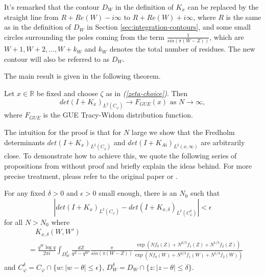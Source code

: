 \begin{remark}
\label{circle-deformation}
It's remarked that the contour $D_W$ in the definition of $K_x$ can be replaced by the straight line from $R + Re(W) - i\infty$ to $R + Re(W) + i \infty$, where $R$ is the same as in the definition of $D_W$ in Section \ref{sec:integration-contours}, and some small circles surrounding the poles coming from the term $\frac{1}{sin(\pi (W - Z))}$, which are $W+1, W+2, \dots, W+k_W$ and $k_W$ denotes the total number of residues. The new contour will also be referred to as $D_W$.
\end{remark}

The main result is given in the following theorem.
\begin{theorem}
\label{asymptotic-theorem}
Let $x \in \mathbb{R}$ be fixed and choose $\zeta$ as in \textit{(\ref{zeta-choice})}. Then $$det(I+K_x)_{L^2(C_{\varphi})} \rightarrow F_{GUE}(x) \text{ as } N \rightarrow \infty,$$ where $F_{GUE}$ is the GUE Tracy-Widom distribution function. 
\end{theorem}

The intuition for the proof is that for $N$ large we show that the Fredholm determinants $det(I+K_x)_{L^2(C_{\varphi})}$ and $det(I+K_{Ai})_{L^2(x,\infty)}$ are arbitrarily close. To demonstrate how to achieve this, we quote the following series of propositions from \cite{asymptotics2013} without proof and briefly explain the ideas behind. For more precise treatment, pleass refer to the original paper \cite{asymptotics2013} or \cite{phase2015}.

\begin{proposition} 
\label{restriction-contour}
For any fixed $\delta > 0$ and $\epsilon > 0$ small enough, there is an $N_0$ such that $$\left| det(I+K_x)_{L^2(C_{\varphi})} - det(I+K_{x,\delta})_{L^2(C_{\varphi}^{\delta})} \right| < \epsilon$$ for all $N > N_0$ where
\begin{align*}
& \quad K_{x,\delta}(W,W') \\
& = \frac{q^W \log q}{2 \pi i} \int_{D_W^{\delta}} \frac{dZ}{q^Z - q^{W'}} \frac{\pi}{sin(\pi (W-Z))} \frac{\exp(Nf_0(Z) + N^{2/3} f_1(Z) + N^{1/3} f_2(Z))}{\exp(Nf_0(W) + N^{2/3} f_1(W) + N^{1/3} f_2(W))}
\end{align*}
and $C_{\varphi}^{\delta} = C_{\varphi} \cap \{w: |w - \theta| \le \epsilon \}$, $D_W^{\delta} = D_W \cap \{z: |z - \theta| \le \delta\}$.
\end{proposition}


